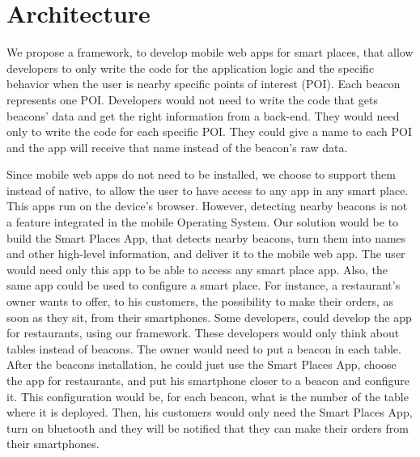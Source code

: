 
% 
% 

\section{Architecture}
\label{sec:architecture}
We propose a framework, to develop mobile web apps for smart
places, that allow developers to only write the code
for the application logic and the specific behavior when
the user is nearby specific points of interest (POI).
Each beacon represents one POI. Developers would not need
to write the code that gets beacons' data and get the
right information from a back-end. They would need only
to write the code for each specific POI. They could give
a name to each POI and the app will receive that name 
instead of the beacon's raw data. 

Since mobile web apps do not need to be installed, 
we choose to support
them instead of native, to allow
the user to have access to any app in any smart place.
This apps run on the device's browser. However, detecting
nearby beacons is not a feature integrated in the mobile
Operating System. Our solution would be to build the
Smart Places App,
that detects nearby beacons, turn them into names and
other high-level information, and deliver it to the
mobile web app. The user would need only this app to
be able to access any smart place app. Also, the same app
could be used to configure a smart place.
For instance, a restaurant's owner wants to offer, to
his customers, the possibility to make their orders,
as soon as they sit, from their smartphones. Some
developers, could develop the app for restaurants,
using our framework. These developers would only think
about tables instead of beacons. The owner would need
to put a beacon in each table. After the beacons
installation, he could just use the Smart Places App,
choose the app for restaurants, and put his smartphone
closer to a beacon and configure it. This configuration
would be, for each beacon, what is the number of the table
where it is deployed. Then, his customers would only
need the Smart Places App, turn on bluetooth and they will
be notified that they can make their orders from their
smartphones.

